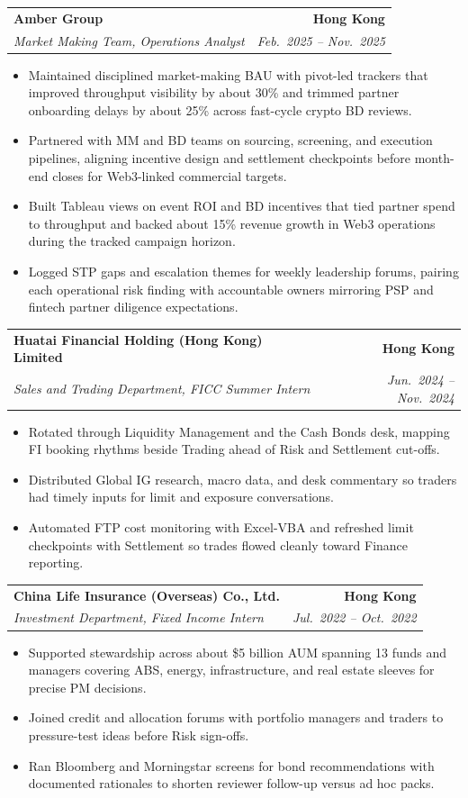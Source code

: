 \documentclass[9pt,a4paper]{extarticle}
\makeatletter
\newcommand{\resumeSubheading}[4]{%
  \vspace{0.6em}%
  \begin{tabular*}{\textwidth}{l@{\extracolsep{\fill}}r}
    \textbf{#1} & \textbf{#2} \\
    \textit{\small #3} & \textit{\small #4} \\
  \end{tabular*}\vspace{0.32em}}
\makeatother
\begin{document}
\resumeSubheading{Amber Group}{Hong Kong}{Market Making Team, Operations Analyst}{Feb.\ 2025 -- Nov.\ 2025}
\begin{itemize}
  \item Maintained disciplined market-making BAU with pivot-led trackers that improved throughput visibility by about 30\% and trimmed partner onboarding delays by about 25\% across fast-cycle crypto BD reviews.
  \item Partnered with MM and BD teams on sourcing, screening, and execution pipelines, aligning incentive design and settlement checkpoints before month-end closes for Web3-linked commercial targets.
  \item Built Tableau views on event ROI and BD incentives that tied partner spend to throughput and backed about 15\% revenue growth in Web3 operations during the tracked campaign horizon.
  \item Logged STP gaps and escalation themes for weekly leadership forums, pairing each operational risk finding with accountable owners mirroring PSP and fintech partner diligence expectations.
\end{itemize}

\resumeSubheading{Huatai Financial Holding (Hong Kong) Limited}{Hong Kong}{Sales and Trading Department, FICC Summer Intern}{Jun.\ 2024 -- Nov.\ 2024}
\begin{itemize}
  \item Rotated through Liquidity Management and the Cash Bonds desk, mapping FI booking rhythms beside Trading ahead of Risk and Settlement cut-offs.
  \item Distributed Global IG research, macro data, and desk commentary so traders had timely inputs for limit and exposure conversations.
  \item Automated FTP cost monitoring with Excel-VBA and refreshed limit checkpoints with Settlement so trades flowed cleanly toward Finance reporting.
\end{itemize}

\resumeSubheading{China Life Insurance (Overseas) Co., Ltd.}{Hong Kong}{Investment Department, Fixed Income Intern}{Jul.\ 2022 -- Oct.\ 2022}
\begin{itemize}
  \item Supported stewardship across about \$5 billion AUM spanning 13 funds and managers covering ABS, energy, infrastructure, and real estate sleeves for precise PM decisions.
  \item Joined credit and allocation forums with portfolio managers and traders to pressure-test ideas before Risk sign-offs.
  \item Ran Bloomberg and Morningstar screens for bond recommendations with documented rationales to shorten reviewer follow-up versus ad hoc packs.
\end{itemize}
\end{document}
